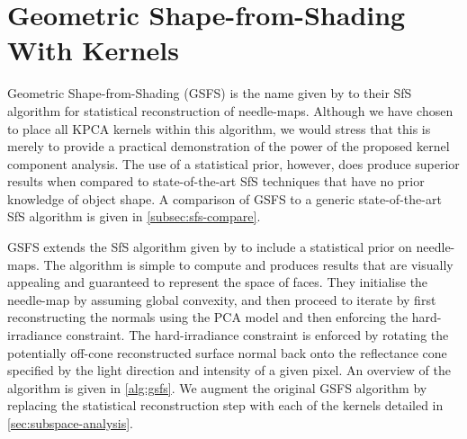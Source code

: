 \section{Geometric Shape-from-Shading With Kernels}\label{sec:singl_img_gsfs}
Geometric Shape-from-Shading (GSFS) is the name given by 
\citet{RefWorks:86,RefWorks:90} to their SfS algorithm for statistical 
reconstruction of needle-maps. Although we have chosen to place all KPCA
kernels within this algorithm, we would stress that this is merely to provide a
practical demonstration of the power of the proposed kernel component analysis.
The use of a statistical prior, however, does produce superior results when
compared to state-of-the-art SfS techniques that have no prior knowledge of
object shape. A comparison of GSFS to a generic state-of-the-art SfS algorithm
is given in \cref{subsec:sfs-compare}.

GSFS extends the SfS algorithm given by \citet{RefWorks:252} to include a 
statistical prior on needle-maps. The algorithm
is simple to compute and produces results that are visually appealing and
guaranteed to represent the space of faces. They initialise the needle-map by
assuming global convexity, and then proceed to iterate by first reconstructing
the normals using the PCA model and then enforcing the hard-irradiance
constraint. The hard-irradiance constraint is enforced by rotating the
potentially off-cone reconstructed surface normal back onto the reflectance cone
specified by the light direction and intensity of a given pixel. An overview of
the algorithm is given in \cref{alg:gsfs}. We augment the original GSFS
algorithm by replacing the statistical reconstruction step with each of the
kernels detailed in \cref{sec:subspace-analysis}.

